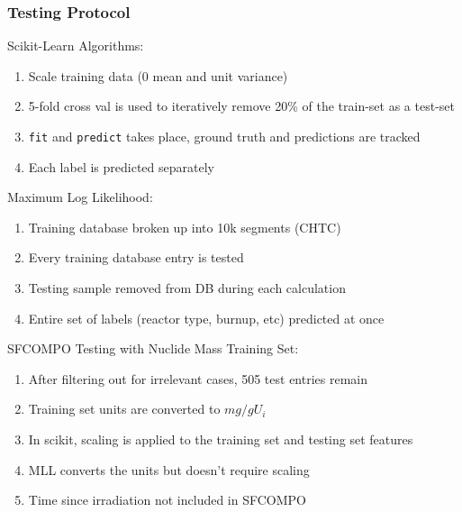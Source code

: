 
\begin{frame}
  \frametitle{Testing Protocol}
  \begin{adjustwidth}{-15pt}{0pt}
  \vspace{-5pt}
  \begin{block}{Scikit-Learn Algorithms:}
    \begin{enumerate}
      \itemsep 0.2em 
      \footnotesize
      \item Scale training data ($0$ mean and unit variance)
      \item 5-fold cross val is used to iteratively remove 20\% of the train-set as a test-set
      \item \texttt{fit} and \texttt{predict} takes place, ground truth and predictions are tracked
      \item Each label is predicted separately
    \end{enumerate}
  \end{block}
  \pause
  \vspace{-5pt}
  \begin{block}{Maximum Log Likelihood:}
    \begin{enumerate}
      \itemsep 0.2em 
      \footnotesize
      \item Training database broken up into 10k segments (CHTC)
      \item Every training database entry is tested
      \item Testing sample removed from DB during each calculation
      \item Entire set of labels (reactor type, burnup, etc) predicted at once
    \end{enumerate}
  \end{block}
  \pause
  \vspace{-5pt}
  \begin{block}{SFCOMPO Testing with Nuclide Mass Training Set:}
    \begin{enumerate}
      \itemsep 0.2em 
      \footnotesize
      \item After filtering out for irrelevant cases, 505 test entries remain
      \item Training set units are converted to $mg/gU_i$
      \item In scikit, scaling is applied to the training set and testing set features
      \item MLL converts the units but doesn't require scaling
      \item Time since irradiation not included in SFCOMPO
    \end{enumerate}
  \end{block}
  \end{adjustwidth}
\end{frame}

